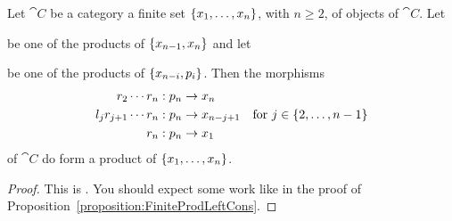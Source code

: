\begin{proposition}\label{proposition:FiniteProdRightCons}
Let \(\cat C\) be a category a finite set \(\left\{x_1, \dots{}, x_n\right\}\), with \(n \ge 2\), of objects of \(\cat C\). Let
be one of the products of \(\left\{x_{n-1}, x_n\right\}\) and let
be one of the products of \(\left\{x_{n-i}, p_i\right\}\).
%
%
Then the morphisms
\[\begin{aligned}
r_2 \cdots{} r_n &: p_n \to x_n \\
l_j r_{j+1} \cdots{} r_n &: p_n \to x_{n-j+1} \quad \text{for } j \in \left\{2, \dots{}, n-1\right\} \\
r_n &: p_n \to x_1
\end{aligned}\]
of \(\cat C\) do form a product of \(\left\{x_1, \dots{}, x_n\right\}\).
\end{proposition}

\begin{proof}
This is . You should expect some work like in the proof of Proposition~\ref{proposition:FiniteProdLeftCons}.
\end{proof}

